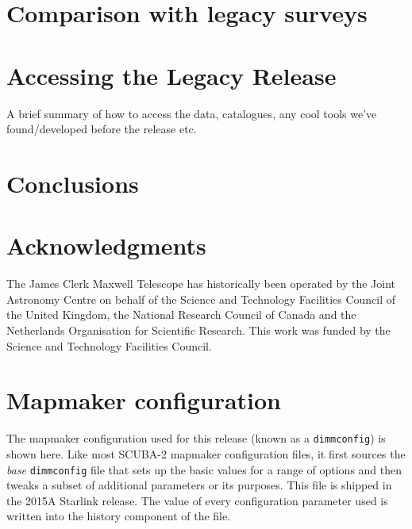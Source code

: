 \documentclass[usenatbib]{mn2e}
\begin{document}
\section{Comparison with legacy surveys}

\section{Accessing the Legacy Release}
A brief summary of how to access the data, catalogues, any cool tools
we've found/developed before the release etc.

\section{Conclusions}

\section*{Acknowledgments}

The James Clerk Maxwell Telescope has historically been operated by
the Joint Astronomy Centre on behalf of the Science and Technology
Facilities Council of the United Kingdom, the National Research
Council of Canada and the Netherlands Organisation for Scientific
Research. This work was funded by the Science and Technology Facilities
Council.




\appendix
\onecolumn

\section{Mapmaker configuration}
The mapmaker configuration used for this release (known as a
\texttt{dimmconfig}) is shown here. Like most SCUBA-2 mapmaker
configuration files, it first sources the \emph{base}
\texttt{dimmconfig} file that sets up the basic values for a range of
options and then tweaks a subset of additional parameters or its
purposes. This file is shipped in the 2015A Starlink release. The
value of every configuration parameter used is written into the
history component of the file.
\end{document}
